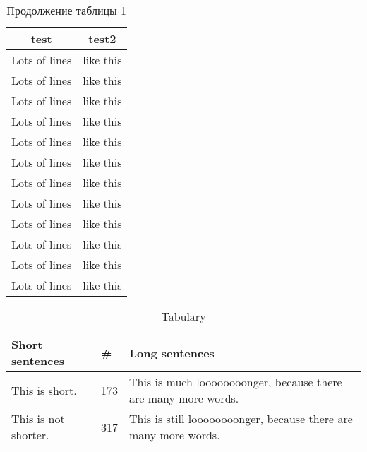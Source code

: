 \begin{longtable}{|l|l|}
    \caption{Длинная таблица}\label{tab:long}\\\hline
    \multicolumn{1}{|c|}{\textbf{test}} & 
    \multicolumn{1}{c|}{\textbf{test2}} \\\hline 
\endfirsthead
    \caption*{Продолжение таблицы \ref{tab:long}}
\endhead
     Lots of lines & like this\\\hline
     Lots of lines & like this\\\hline
     Lots of lines & like this\\\hline
     Lots of lines & like this\\\hline
     Lots of lines & like this\\\hline
     Lots of lines & like this\\\hline
     Lots of lines & like this\\\hline
     Lots of lines & like this\\\hline
     Lots of lines & like this\\\hline
     Lots of lines & like this\\\hline
     Lots of lines & like this\\\hline
     Lots of lines & like this\\\hline
\end{longtable}

\begin{table}[H]
    \caption{Tabulary}\label{tab:y}
  \begin{tabulary}{\textwidth}{|L|L|L|}
  \hline
    Short sentences & \# & Long sentences \\\hline
    This is short. & 173 & This is much loooooooonger, because there are many more words. \\
    \hline
This is not shorter. & 317 & This is still loooooooonger, because there are many more words. \\
\hline
  \end{tabulary}  
\end{table}

